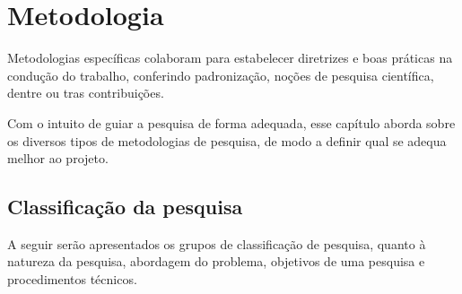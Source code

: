 \chapter{Metodologia}
Metodologias específicas colaboram para estabelecer diretrizes e boas práticas na condução do trabalho, conferindo padronização, noções de pesquisa científica, dentre ou tras contribuições. \cite{Wohlin:2000}

Com o intuito de guiar a pesquisa de forma adequada, esse capítulo aborda sobre os diversos tipos de metodologias de pesquisa, de modo a definir qual se adequa melhor ao projeto.


%
%
\section{Classificação da pesquisa}
A seguir serão apresentados os grupos de classificação de pesquisa, quanto à natureza da pesquisa, abordagem do problema, objetivos de uma pesquisa e procedimentos técnicos.


